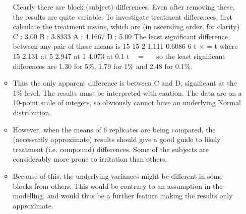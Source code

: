 \documentclass[a4paper,12pt]{article}
\begin{document}
\begin{enumerate}
\begin{itemize}
Clearly there are block (subject) differences. Even after removing these, the results are quite variable.
To investigate treatment differences, first calculate the treatment means, which are (in
ascending order, for clarity)
C : 3.00 B : 3.8333 A : 4.1667 D : 5.00
The least significant difference between any pair of these means is
15 15
2 1.111 0.6086
6
t × = t where 15
2.131 at 5%
2.947 at 1%
4.073 at 0.1%
t

=


so the least significant differences are 1.30 for 5\%, 1.79 for 1\% and 2.48 for 0.1\%.
\item Thus the only apparent difference is between C and D, significant at the 1\% level.
The results must be interpreted with caution.
The data are on a 10-point scale of integers, so obviously cannot have an underlying
Normal distribution. 
\item However, when the means of 6 replicates are being compared,
the (necessarily approximate) results should give a good guide to likely treatment (i.e.
compound) differences.
Some of the subjects are considerably more prone to irritation than others. 
\item Because of
this, the underlying variances might be different in some blocks from others. This
would be contrary to an assumption in the modelling, and would thus be a further
feature making the results only approximate.

\end{itemize}
\end{enumerate}
\end{document}
